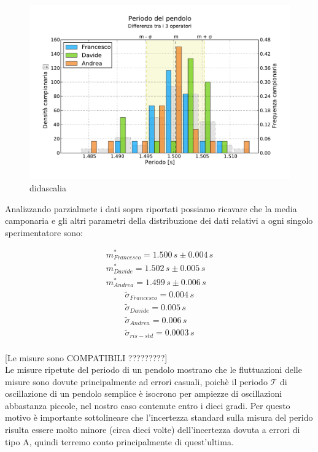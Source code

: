 \begin{figure}[bt]
	\centering
	\includegraphics[width=150mm]{grafici/pendolo3.pdf}
	\caption{didascalia}
    \label{fig:pendolo3}
\end{figure}

Analizzando parzialmete i dati sopra riportati possiamo ricavare che la media
camponaria e gli altri parametri della distribuzione dei dati relativi a
ogni singolo sperimentatore sono:

\begin{equation*}
	\begin{split}
		m_{Francesco}^* = 1.500\,s \pm 0.004\,s \\
		m_{Davide}^* = 1.502\,s \pm 0.005\,s \\
		m_{Andrea}^* = 1.499\,s \pm 0.006\,s
	\end{split}
\end{equation*}
\begin{equation*}
	\begin{split}
		\tilde{\sigma}_{Francesco} = 0.004\,s \\
		\tilde{\sigma}_{Davide} = 0.005\,s \\
		\tilde{\sigma}_{Andrea} = 0.006\,s \\
		\tilde{\sigma}_{ris-std} = 0.0003\,s
	\end{split}
\end{equation*}\\

[Le misure sono COMPATIBILI ?????????]\\

Le misure ripetute del periodo di un pendolo mostrano che le fluttuazioni
delle misure sono dovute principalmente ad errori casuali, poichè il periodo
$\mathcal{T}$ di oscillazione di un pendolo semplice è isocrono per ampiezze
di oscillazioni abbastanza piccole, nel nostro caso contenute entro i dieci gradi.
Per questo motivo è importante sottolineare che l'incertezza standard sulla
misura del perido risulta essere molto minore (circa dieci volte) dell'incertezza
dovuta a errori di tipo A, quindi terremo conto principalmente di quest'ultima.

